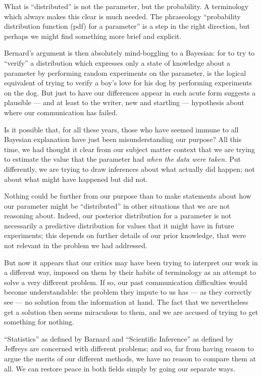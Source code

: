 \documentclass[12pt]{article}
\begin{document}
What is ``distributed'' is not the parameter, but the
probability. A terminology which always makes this clear is
much needed. The phraseology ``probability distribution function
(pdf) for a parameter'' is a step in the right direction, but
perhaps we might find something more brief and explicit.

Bernard's argument is then absolutely mind-boggling to a
Bayesian: for to try to ``verify'' a distribution which expresses
only a state of knowledge about a parameter by performing
random experiments on the parameter, is the logical equivalent
of trying to verify a boy's love for his dog by performing
experiments on the dog. But just to have our differences appear
in such acute form suggests a plausible --- and at least to the
writer, new and startling --- hypothesis about where our
communication has failed.

Is it possible that, for all these years, those who have
seemed immune to all Bayesian explanation have just been
misunderstanding our purpose? All this time, we had thought it
clear from our subject matter context that we are trying to
estimate the value that the parameter had \emph{when the data were
taken.} Put differently, we are trying to draw inferences about
what actually did happen; not about what might have happened
but did not.

Nothing could be further from our purpose than to make
statements about how our parameter might be ``distributed'' in
other situations that we are not reasoning about. Indeed, our
posterior distribution for a parameter is not necessarily a
predictive distribution for values that it might have in future
experiments; this depends on further details of our prior
knowledge, that were not relevant in the problem we had
addressed.

But now it appears that our critics may have been trying to
interpret our work in a different way, imposed on them by their
habits of terminology as an attempt to solve a very different
problem. If so, our past communication difficulties would
become understandable: the problem they impute to us has --- as
they correctly see --- no solution from the information at hand.
The fact that we nevertheless get a solution then seems
miraculous to them, and we are accused of trying to get
something for nothing.

``Statistics'' as defined by Barnard and ``Scientific
Inference'' as defined by Jeffreys are concerned with different
problems; and so, far from having reason to argue the merits of
our different methods, we have no reason to compare them at
all. We can restore peace in both fields simply by going our
separate ways.
\end{document}
